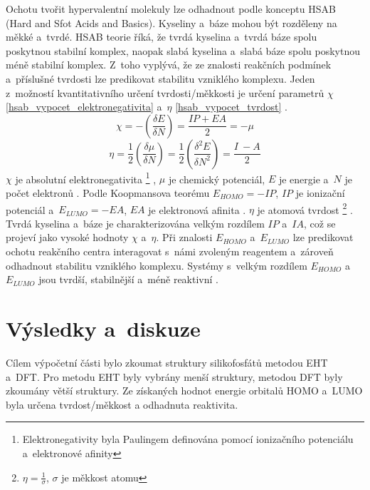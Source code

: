 \documentclass[
  printed, %
  table,   %
  lof,     %
  lot,     %
  oneside,
]{fithesis3}
\begin{document}
Ochotu tvořit hypervalentní molekuly lze odhadnout podle konceptu HSAB (Hard and Sfot Acids and Basics). Kyseliny a~báze mohou být rozděleny na měkké a~tvrdé. HSAB teorie říká, že tvrdá kyselina a~tvrdá báze spolu poskytnou stabilní komplex, naopak slabá kyselina a~slabá báze spolu poskytnou méně stabilní komplex. Z~toho vyplývá, že ze znalosti reakčních podmínek a~příslušné tvrdosti lze predikovat stabilitu vzniklého komplexu. Jeden z~možností kvantitativního určení tvrdosti/měkkosti je určení parametrů $\chi$ \ref{hsab_vypocet_elektronegativita} a~$\eta$ \ref{hsab_vypocet_tvrdost} \cite{hsabclanek}. 
\begin{equation}
\chi = - \left( \frac{\delta E}{\delta N} \right) = \frac{IP + EA}{2} = -\mu
\label{hsab_vypocet_elektronegativita}
\end{equation} 
\begin{equation}
\eta = \frac{1}{2} \left( \frac{\delta \mu}{\delta N} \right) = \frac{1}{2}\left( \frac{\delta^2 E}{\delta N^2} \right) = \frac{I~- A}{2}
\label{hsab_vypocet_tvrdost}
\end{equation} 
$\chi$ je absolutní elektronegativita  \footnote{Elektronegativity byla Paulingem definována pomocí ionizačního potenciálu a~elektronové afinity} , $\mu$ je chemický potenciál, $E$ je energie a~$N$ je počet elektronů \cite{hsabwatoc}. Podle Koopmansova teorému $E_{HOMO} = - IP$, $IP$ je ionizační potenciál a~$E_{LUMO} = -EA$, $EA$ je elektronová afinita \cite{kratochvilexcerpta}. $\eta$ je atomová tvrdost \footnote{$\eta = \frac{1}{\sigma}$, $\sigma$ je měkkost atomu} \cite{pearson1986absolute}. Tvrdá kyselina a~báze je charakterizována velkým rozdílem $IP$ a~$IA$, což se projeví jako vysoké hodnoty $\chi$ a~$\eta$. Při znalosti $E_{HOMO}$ a~$E_{LUMO}$ lze predikovat ochotu reakčního centra interagovat s~námi zvoleným reagentem a~zároveň odhadnout stabilitu vzniklého komplexu. Systémy s~velkým rozdílem $E_{HOMO}$ a~$E_{LUMO}$ jsou tvrdší, stabilnější a~méně reaktivní \cite{hsabwatoc}.

\chapter{Výsledky a~diskuze}
Cílem výpočetní části bylo zkoumat struktury silikofosfátů metodou EHT a~DFT. Pro metodu EHT byly vybrány menší struktury, metodou DFT byly zkoumány větší struktury. Ze získaných hodnot energie orbitalů HOMO a~LUMO byla určena tvrdost/měkkost a odhadnuta reaktivita.
\end{document}
